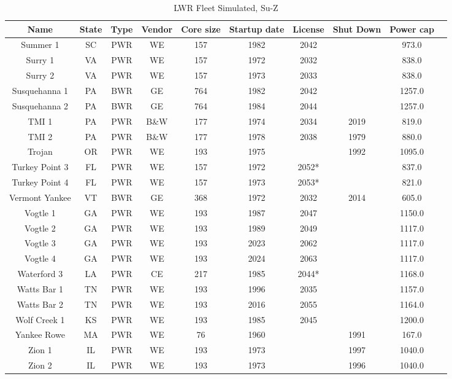 \begin{table}
    \centering
    \caption{LWR Fleet Simulated, Su-Z}
    \label{tab:lwr_fleet3}
    \begin{tabular}{c c c c c c c c c c}
    \hline
    \textbf{Name} & \textbf{State} & \textbf{Type} & \textbf{Vendor} & \textbf{Core size} & \textbf{Startup date} & \textbf{License} & \textbf{Shut Down} & \textbf{Power cap} \\
    \hline
    Summer 1            & SC & PWR & WE   & 157 & 1982 & 2042 &      & 973.0 \\
    Surry 1             & VA & PWR & WE   & 157 & 1972 & 2032 &      & 838.0 \\
    Surry 2             & VA & PWR & WE   & 157 & 1973 & 2033 &      & 838.0 \\
    Susquehanna 1       & PA & BWR & GE   & 764 & 1982 & 2042 &      & 1257.0 \\
    Susquehanna 2       & PA & BWR & GE   & 764 & 1984 & 2044 &      & 1257.0 \\
    TMI 1               & PA & PWR & B\&W & 177 & 1974 & 2034 & 2019 & 819.0 \\
    TMI 2               & PA & PWR & B\&W & 177 & 1978 & 2038 & 1979 & 880.0 \\
    Trojan              & OR & PWR & WE   & 193 & 1975 &      & 1992 & 1095.0 \\
    Turkey Point 3      & FL & PWR & WE   & 157 & 1972 & 2052*&      & 837.0 \\
    Turkey Point 4      & FL & PWR & WE   & 157 & 1973 & 2053*&      & 821.0 \\
    Vermont Yankee      & VT & BWR & GE   & 368 & 1972 & 2032 & 2014 & 605.0 \\
    Vogtle 1            & GA & PWR & WE   & 193 & 1987 & 2047 &      & 1150.0 \\
    Vogtle 2            & GA & PWR & WE   & 193 & 1989 & 2049 &      & 1117.0 \\
    Vogtle 3            & GA & PWR & WE   & 193 & 2023 & 2062 &      & 1117.0 \\
    Vogtle 4            & GA & PWR & WE   & 193 & 2024 & 2063 &      & 1117.0 \\
    Waterford 3         & LA & PWR & CE   & 217 & 1985 & 2044*&      & 1168.0 \\
    Watts Bar 1         & TN & PWR & WE   & 193 & 1996 & 2035 &      & 1157.0 \\
    Watts Bar 2         & TN & PWR & WE   & 193 & 2016 & 2055 &      & 1164.0 \\
    Wolf Creek 1        & KS & PWR & WE   & 193 & 1985 & 2045 &      & 1200.0 \\
    Yankee Rowe         & MA & PWR & WE   & 76  & 1960 &      & 1991 & 167.0 \\
    Zion 1              & IL & PWR & WE   & 193 & 1973 &      & 1997 & 1040.0 \\
    Zion 2              & IL & PWR & WE   & 193 & 1973 &      & 1996 & 1040.0 \\
    \hline
    \end{tabular}
\end{table}

